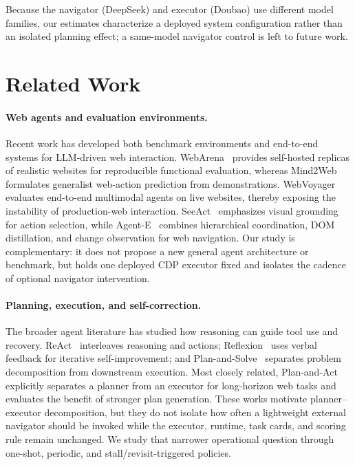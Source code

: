 \documentclass[runningheads]{llncs}
\begin{document}
Because the navigator (DeepSeek) and executor (Doubao) use different model
families, our estimates characterize a deployed system configuration rather
than an isolated planning effect; a same-model navigator control is left to
future work.

\section{Related Work}

\paragraph{Web agents and evaluation environments.}
Recent work has developed both benchmark environments and end-to-end systems for
LLM-driven web interaction. WebArena~\cite{zhou2023webarena} provides
self-hosted replicas of realistic websites for reproducible functional evaluation,
whereas Mind2Web~\cite{deng2023mind2web} formulates generalist web-action
prediction from demonstrations. WebVoyager~\cite{he2024webvoyager} evaluates
end-to-end multimodal agents on live websites, thereby exposing the instability
of production-web interaction. SeeAct~\cite{zheng2024seeact} emphasizes visual
grounding for action selection, while Agent-E~\cite{emergence2024agente}
combines hierarchical coordination, DOM distillation, and change observation for
web navigation. Our study is complementary: it does not propose a new general
agent architecture or benchmark, but holds one deployed CDP executor fixed and
isolates the cadence of optional navigator intervention.

\paragraph{Planning, execution, and self-correction.}
The broader agent literature has studied how reasoning can guide tool use and
recovery. ReAct~\cite{yao2023react} interleaves reasoning and actions;
Reflexion~\cite{shinn2023reflexion} uses verbal feedback for iterative
self-improvement; and Plan-and-Solve~\cite{wang2023planandsolve} separates
problem decomposition from downstream execution. Most closely related,
Plan-and-Act~\cite{erdogan2025planandact} explicitly separates a planner from
an executor for long-horizon web tasks and evaluates the benefit of stronger plan
generation. These works motivate planner--executor decomposition, but they do
not isolate how often a lightweight external navigator should be invoked while
the executor, runtime, task cards, and scoring rule remain unchanged. We study
that narrower operational question through one-shot, periodic, and
stall/revisit-triggered policies.
\end{document}

